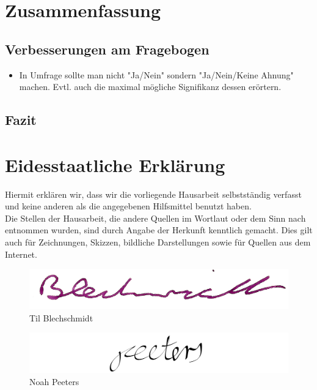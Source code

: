 \documentclass[a4paper]{article}
\begin{document}
    \clearpage
    \section{Zusammenfassung}
        \subsection{Verbesserungen am Fragebogen}
            \begin{itemize}
                \item In Umfrage sollte man nicht "Ja/Nein" sondern "Ja/Nein/Keine Ahnung" machen. Evtl. auch die maximal mögliche Signifikanz dessen erörtern.
            \end{itemize}
            
        \subsection{Fazit}
        
    
    \clearpage
    \section{Eidesstaatliche Erklärung}
        Hiermit erklären wir, dass wir die vorliegende Hausarbeit selbstständig verfasst und keine anderen als die angegebenen Hilfsmittel benutzt haben.\\
        Die Stellen der Hausarbeit, die andere Quellen im Wortlaut oder dem Sinn nach entnommen wurden, sind durch Angabe der Herkunft kenntlich gemacht. Dies gilt auch für Zeichnungen, Skizzen, bildliche Darstellungen sowie für Quellen aus dem Internet.
        
        
        \begin{figure}[H]
            \centering
            \begin{minipage}{.5\textwidth}
                \centering
                \includegraphics[width=\textwidth]{assets/signature_tilb.png}
                Til Blechschmidt
                \label{fig:test1}
            \end{minipage}%
            \begin{minipage}{.5\textwidth}
                \centering
                \includegraphics[width=\textwidth]{assets/signature_noahp.png}
                Noah Peeters
                \label{fig:test2}
            \end{minipage}
        \end{figure}
        \clearpage
    
\end{document}
